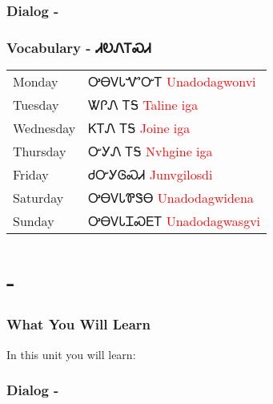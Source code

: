 \subsection{Dialog - }

\subsection{Vocabulary - ᏗᎧᏁᎢᏍᏗ 
}
\begin{tabular}{p{3cm} p{11cm}}
Monday & ᎤᎾᏙᏓᏉᏅᎢ 
 \newline \textcolor{red}{Unadodagwonvi}\\
Tuesday & ᏔᎵᏁ ᎢᎦ 
 \newline \textcolor{red}{Taline iga}\\
Wednesday & ᏦᎢᏁ ᎢᎦ 
 \newline \textcolor{red}{Joine iga}\\
Thursday & ᏅᎩᏁ ᎢᎦ 
 \newline \textcolor{red}{Nvhgine iga}\\
Friday & ᏧᏅᎩᎶᏍᏗ 
 \newline \textcolor{red}{Junvgilosdi}\\
Saturday & ᎤᎾᏙᏓᏈᏕᎾ 
 \newline \textcolor{red}{Unadodagwidena}\\
Sunday & ᎤᎾᏙᏓᏆᏍᎬᎢ 
 \newline \textcolor{red}{Unadodagwasgvi}\\
\end{tabular}

\index{}
\index{}
\chapter{ - }
\subsection{What You Will Learn}
In this unit you will learn:

\subsection{Dialog - }

